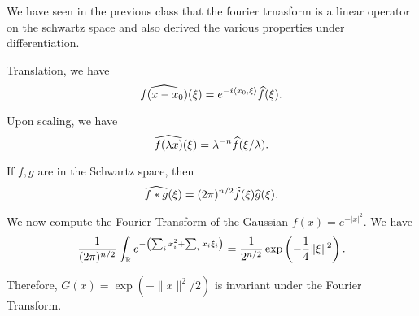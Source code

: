 We have seen in the previous class that the fourier trnasform is a linear operator on the schwartz space and also derived the various properties under differentiation.

Translation, we have 
\begin{equation*}
    \widehat{f(x - x_0)}(\xi) = e^{-i\langle x_0, \xi\rangle}\widehat{f}(\xi).
\end{equation*}

Upon scaling, we have 
\begin{equation*}
    \widehat{f(\lambda x)}(\xi) = \lambda^{-n}\widehat{f}(\xi/\lambda).
\end{equation*}

\begin{proposition}
    If $f, g$ are in the Schwartz space, then 
    \begin{equation*}
        \widehat{f\ast g}(\xi) = (2\pi)^{n/2}\widehat{f}(\xi)\widehat{g}(\xi).
    \end{equation*}
\end{proposition}

We now compute the Fourier Transform of the Gaussian $f(x) = e^{-|x|^2}$. We have 
\begin{equation*}
    \frac{1}{(2\pi)^{n/2}}\int_{\mathbb{R}} e^{-\left(\sum_{i} x_i^2 + \sum_{i} x_i\xi_i\right)} = \frac{1}{2^{n/2}}\exp\left(-\frac{1}{4}\|\xi\|^2\right).
\end{equation*}

Therefore, $G(x) = \exp(-\|x\|^2/2)$ is invariant under the Fourier Transform.